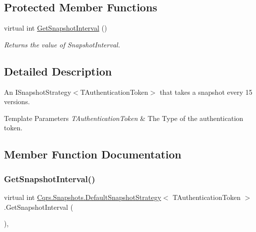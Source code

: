 \subsection*{Protected Member Functions}
\begin{DoxyCompactItemize}
\item 
virtual int \hyperlink{classCqrs_1_1Snapshots_1_1DefaultSnapshotStrategy_a3540a6d621d8c23816da761f929d83a7_a3540a6d621d8c23816da761f929d83a7}{Get\+Snapshot\+Interval} ()
\begin{DoxyCompactList}\small\item\em Returns the value of Snapshot\+Interval. \end{DoxyCompactList}\end{DoxyCompactItemize}


\subsection{Detailed Description}
An I\+Snapshot\+Strategy$<$\+T\+Authentication\+Token$>$ that takes a snapshot every 15 versions. 


\begin{DoxyTemplParams}{Template Parameters}
{\em T\+Authentication\+Token} & The Type of the authentication token.\\
\hline
\end{DoxyTemplParams}


\subsection{Member Function Documentation}
\mbox{\label{classCqrs_1_1Snapshots_1_1DefaultSnapshotStrategy_a3540a6d621d8c23816da761f929d83a7_a3540a6d621d8c23816da761f929d83a7}} 
\subsubsection{\texorpdfstring{Get\+Snapshot\+Interval()}{GetSnapshotInterval()}}
{\footnotesize\ttfamily virtual int \hyperlink{classCqrs_1_1Snapshots_1_1DefaultSnapshotStrategy}{Cqrs.\+Snapshots.\+Default\+Snapshot\+Strategy}$<$ T\+Authentication\+Token $>$.Get\+Snapshot\+Interval (\begin{DoxyParamCaption}{ }\end{DoxyParamCaption})\hspace{0.3cm}{\ttfamily [protected]}, {\ttfamily [virtual]}}



